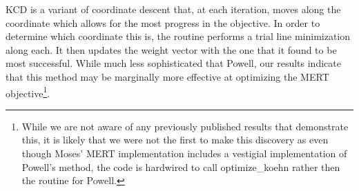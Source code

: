 \documentclass[11pt]{article}
\begin{document}
KCD is a variant of coordinate descent that, at each iteration, moves along the coordinate which allows for the most progress in the objective. In order to determine which coordinate this is, the routine performs a trial line minimization along each. It then updates the weight vector with the one that it found to be most successful. While much less sophisticated that Powell, our results indicate that this method may be marginally more effective at optimizing the MERT objective\footnote{While we are not aware of any previously published results that demonstrate this, it is likely that we were not the first to make this discovery as even though Moses' MERT implementation includes a vestigial implementation of Powell's method, the code is hardwired to call optimize\_koehn rather then the routine for Powell.}.


\end{document}
